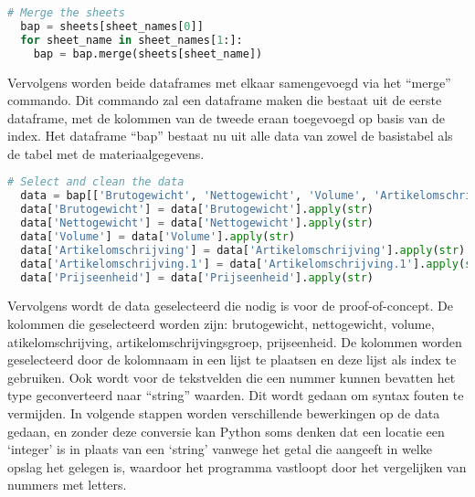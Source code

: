 \begin{lstlisting}[language=Python, caption={Het mergen van twee dataframes.}]
  # Merge the sheets
  bap = sheets[sheet_names[0]]
  for sheet_name in sheet_names[1:]:
    bap = bap.merge(sheets[sheet_name])
\end{lstlisting}

Vervolgens worden beide dataframes met elkaar samengevoegd via het “merge” commando. Dit commando zal een dataframe maken die bestaat uit de eerste dataframe, met de kolommen van de tweede eraan toegevoegd op basis van de index. Het dataframe “bap” bestaat nu uit alle data van zowel de basistabel als de tabel met de materiaalgegevens.

\begin{lstlisting}[language=Python, caption={Het selecteren en cleanen van de data.}]
  # Select and clean the data
  data = bap[['Brutogewicht', 'Nettogewicht', 'Volume', 'Artikelomschrijving', 'Artikelomschrijving.1', 'Prijseenheid']]
  data['Brutogewicht'] = data['Brutogewicht'].apply(str)
  data['Nettogewicht'] = data['Nettogewicht'].apply(str)
  data['Volume'] = data['Volume'].apply(str)
  data['Artikelomschrijving'] = data['Artikelomschrijving'].apply(str)
  data['Artikelomschrijving.1'] = data['Artikelomschrijving.1'].apply(str)
  data['Prijseenheid'] = data['Prijseenheid'].apply(str)
\end{lstlisting}

Vervolgens wordt de data geselecteerd die nodig is voor de proof-of-concept. De kolommen die geselecteerd worden zijn: brutogewicht, nettogewicht, volume, atikelomschrijving, artikelomschrijvingsgroep, prijseenheid. De kolommen worden geselecteerd door de kolomnaam in een lijst te plaatsen en deze lijst als index te gebruiken. 
Ook wordt voor de tekstvelden die een nummer kunnen bevatten het type geconverteerd naar “string” waarden. Dit wordt gedaan om syntax fouten te vermijden. In volgende stappen worden verschillende bewerkingen op de data gedaan, en zonder deze conversie kan Python soms denken dat een locatie een ‘integer’ is in plaats van een ‘string’ vanwege het getal die aangeeft in welke opslag het gelegen is, waardoor het programma vastloopt door het vergelijken van nummers met letters.

\section{}%
\label{sec:duplicaatdetectie}

